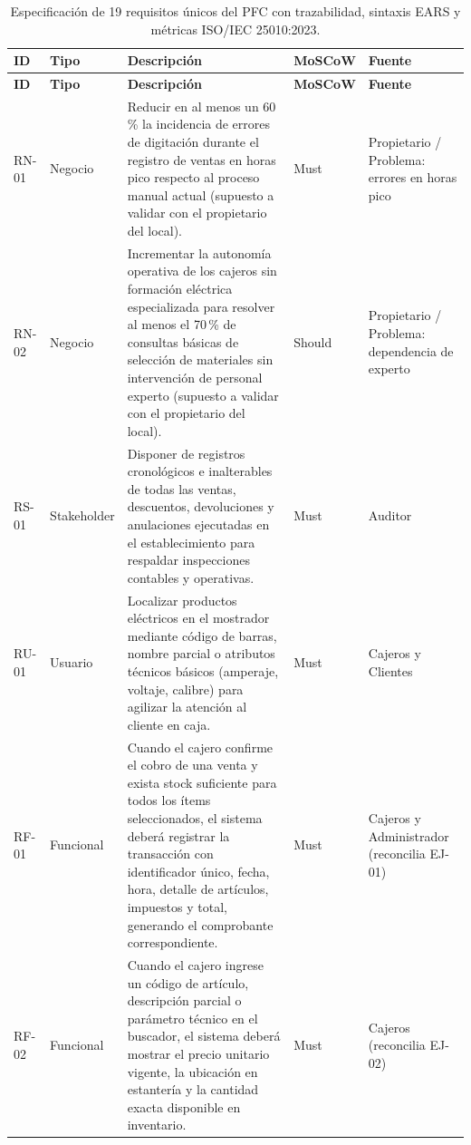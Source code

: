 \documentclass[onecolumn,12pt]{IEEEtran}
\begin{document}
	\begin{longtable}{>{\raggedright\arraybackslash}p{1.4cm} >{\raggedright\arraybackslash}p{2.3cm} >{\raggedright\arraybackslash}p{7.6cm} >{\raggedright\arraybackslash}p{1.6cm} >{\raggedright\arraybackslash}p{2.3cm}}
		\caption{Especificaci\'on de 19 requisitos \'unicos del PFC con trazabilidad, sintaxis EARS y m\'etricas ISO/IEC 25010:2023.}
		\label{tab:requisitos_pfc}\\
		\toprule
		\textbf{ID} & \textbf{Tipo} & \textbf{Descripci\'on} & \textbf{MoSCoW} & \textbf{Fuente} \\
		\midrule
		\endfirsthead
		\toprule
		\textbf{ID} & \textbf{Tipo} & \textbf{Descripci\'on} & \textbf{MoSCoW} & \textbf{Fuente} \\
		\midrule
		\endhead
		\bottomrule
		\endfoot
		RN-01 & Negocio & Reducir en al menos un 60\,\% la incidencia de errores de digitaci\'on durante el registro de ventas en horas pico respecto al proceso manual actual (supuesto a validar con el propietario del local). & Must & Propietario / Problema: errores en horas pico \\
		\midrule
		RN-02 & Negocio & Incrementar la autonom\'ia operativa de los cajeros sin formaci\'on el\'ectrica especializada para resolver al menos el 70\,\% de consultas b\'asicas de selecci\'on de materiales sin intervenci\'on de personal experto (supuesto a validar con el propietario del local). & Should & Propietario / Problema: dependencia de experto \\
		\midrule
		RS-01 & Stakeholder & Disponer de registros cronol\'ogicos e inalterables de todas las ventas, descuentos, devoluciones y anulaciones ejecutadas en el establecimiento para respaldar inspecciones contables y operativas. & Must & Auditor \\
		\midrule
		RU-01 & Usuario & Localizar productos el\'ectricos en el mostrador mediante c\'odigo de barras, nombre parcial o atributos t\'ecnicos b\'asicos (amperaje, voltaje, calibre) para agilizar la atenci\'on al cliente en caja. & Must & Cajeros y Clientes \\
		\midrule
		RF-01 & Funcional & [EARS: Dirigido por eventos] Cuando el cajero confirme el cobro de una venta y exista stock suficiente para todos los \'items seleccionados, el sistema deber\'a registrar la transacci\'on con identificador \'unico, fecha, hora, detalle de art\'iculos, impuestos y total, generando el comprobante correspondiente. & Must & Cajeros y Administrador (reconcilia EJ-01) \\
		\midrule
		RF-02 & Funcional & [EARS: Dirigido por eventos] Cuando el cajero ingrese un c\'odigo de art\'iculo, descripci\'on parcial o par\'ametro t\'ecnico en el buscador, el sistema deber\'a mostrar el precio unitario vigente, la ubicaci\'on en estanter\'ia y la cantidad exacta disponible en inventario. & Must & Cajeros (reconcilia EJ-02) \\

\end{longtable}
\end{document}
